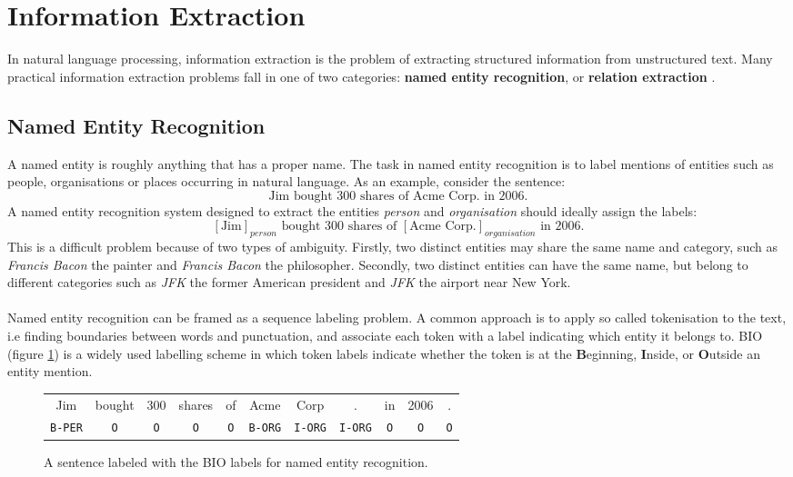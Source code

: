 \section{Information Extraction}
\label{information_extraction}
In natural language processing, information extraction is the problem of extracting structured information from unstructured text. Many practical information extraction problems fall in one of two categories: \textbf{named entity recognition}, or \textbf{relation extraction} \citep{jurafsky09}.

\subsection{Named Entity Recognition}
\label{named_entity_recognition}
A named entity is roughly anything that has a proper name. The task in named entity recognition is to label mentions of entities such as people, organisations or places occurring in natural language. As an example, consider the sentence: 
$$
\text{Jim bought 300 shares of Acme Corp. in 2006.}
$$ 
A named entity recognition system designed to extract the entities \textit{person} and \textit{organisation} should ideally assign the labels:
$$
	[\text{Jim}]_{person} \text{ bought 300 shares of } [\text{Acme Corp.}]_{organisation} \text{ in 2006.}
$$
This is a difficult problem because of two types of ambiguity. Firstly, two distinct entities may share the same name and category, such as \textit{Francis Bacon} the painter and \textit{Francis Bacon} the philosopher. Secondly, two distinct entities can have the same name, but belong to different categories such as \textit{JFK} the former American president and \textit{JFK} the airport near New York.
\\\\
Named entity recognition can be framed as a sequence labeling problem. A common approach is to apply so called tokenisation to the text, i.e finding boundaries between words and punctuation, and associate each token with a label indicating which entity it belongs to. BIO (figure \ref{bio}) is a widely used labelling scheme in which token labels indicate whether the token is at the \textbf{B}eginning, \textbf{I}nside, or \textbf{O}utside an entity mention.
\begin{figure}
	\begin{center}
		\begin{tabular}{c c c c c c c c c c c}
	Jim & bought & 300 & shares & of & Acme & Corp & . & in & 2006 & . \\
	\texttt{B-PER} & \texttt{O} & \texttt{O} & \texttt{O} & \texttt{O} & \texttt{B-ORG} & \texttt{I-ORG} & \texttt{I-ORG} & \texttt{O} & \texttt{O} & \texttt{O}
	\end{tabular}
	\end{center}
	\caption{A sentence labeled with the BIO labels for named entity recognition.}
	\label{bio}
\end{figure}

